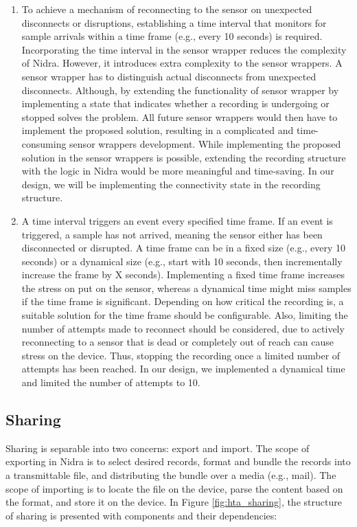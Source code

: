 \begin{enumerate}
    \item To achieve a mechanism of reconnecting to the sensor on unexpected disconnects or disruptions, establishing a time interval that monitors for sample arrivals within a time frame (e.g., every 10 seconds) is required. Incorporating the time interval in the sensor wrapper reduces the complexity of Nidra. However, it introduces extra complexity to the sensor wrappers. A sensor wrapper has to distinguish actual disconnects from unexpected disconnects. Although, by extending the functionality of sensor wrapper by implementing a state that indicates whether a recording is undergoing or stopped solves the problem. All future sensor wrappers would then have to implement the proposed solution, resulting in a complicated and time-consuming sensor wrappers development. While implementing the proposed solution in the sensor wrappers is possible, extending the recording structure with the logic in Nidra would be more meaningful and time-saving. In our design, we will be implementing the connectivity state in the recording structure.
    \item A time interval triggers an event every specified time frame. If an event is triggered, a sample has not arrived, meaning the sensor either has been disconnected or disrupted. A time frame can be in a fixed size (e.g., every 10 seconds) or a dynamical size (e.g., start with 10 seconds, then incrementally increase the frame by X seconds). Implementing a fixed time frame increases the stress on put on the sensor, whereas a dynamical time might miss samples if the time frame is significant. Depending on how critical the recording is, a suitable solution for the time frame should be configurable. Also, limiting the number of attempts made to reconnect should be considered, due to actively reconnecting to a sensor that is dead or completely out of reach can cause stress on the device. Thus, stopping the recording once a limited number of attempts has been reached.  In our design, we implemented a dynamical time and limited the number of attempts to 10. 
\end{enumerate}

\subsection{Sharing} \label{sec:design_sharing}

Sharing is separable into two concerns: export and import. The scope of exporting in Nidra is to select desired records, format and bundle the records into a transmittable file, and distributing the bundle over a media (e.g., mail). The scope of importing is to locate the file on the device, parse the content based on the format, and store it on the device. In Figure \ref{fig:hta_sharing}, the structure of sharing is presented with components and their dependencies: 

